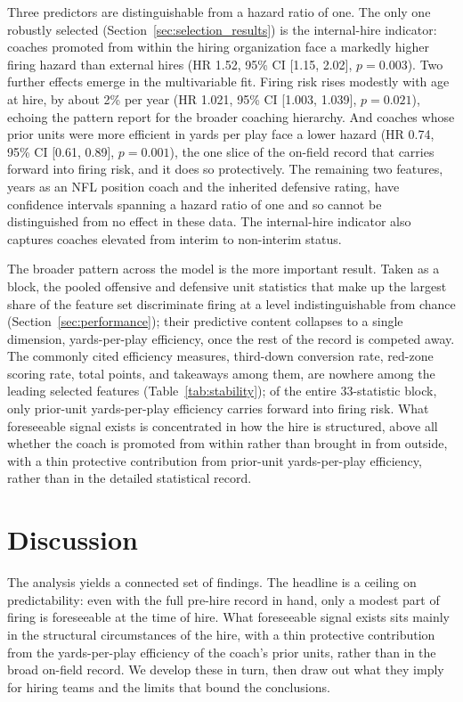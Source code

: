 \documentclass[USenglish]{article}
\theoremstyle{dgthm}
\theoremstyle{dgdef}
\begin{document}
Three predictors are distinguishable from a hazard ratio of one. The only one robustly selected (Section~\ref{sec:selection_results}) is the internal-hire indicator: coaches promoted from within the hiring organization face a markedly higher firing hazard than external hires (HR 1.52, 95\% CI [1.15, 2.02], $p = 0.003$). Two further effects emerge in the multivariable fit. Firing risk rises modestly with age at hire, by about 2\% per year (HR 1.021, 95\% CI [1.003, 1.039], $p = 0.021$), echoing the pattern \citet{farnell2021} report for the broader coaching hierarchy. And coaches whose prior units were more efficient in yards per play face a lower hazard (HR 0.74, 95\% CI [0.61, 0.89], $p = 0.001$), the one slice of the on-field record that carries forward into firing risk, and it does so protectively. The remaining two features, years as an NFL position coach and the inherited defensive rating, have confidence intervals spanning a hazard ratio of one and so cannot be distinguished from no effect in these data. The internal-hire indicator also captures coaches elevated from interim to non-interim status.

The broader pattern across the model is the more important result. Taken as a block, the pooled offensive and defensive unit statistics that make up the largest share of the feature set discriminate firing at a level indistinguishable from chance (Section~\ref{sec:performance}); their predictive content collapses to a single dimension, yards-per-play efficiency, once the rest of the record is competed away. The commonly cited efficiency measures, third-down conversion rate, red-zone scoring rate, total points, and takeaways among them, are nowhere among the leading selected features (Table~\ref{tab:stability}); of the entire 33-statistic block, only prior-unit yards-per-play efficiency carries forward into firing risk. What foreseeable signal exists is concentrated in how the hire is structured, above all whether the coach is promoted from within rather than brought in from outside, with a thin protective contribution from prior-unit yards-per-play efficiency, rather than in the detailed statistical record.

\section{Discussion}

The analysis yields a connected set of findings. The headline is a ceiling on predictability: even with the full pre-hire record in hand, only a modest part of firing is foreseeable at the time of hire. What foreseeable signal exists sits mainly in the structural circumstances of the hire, with a thin protective contribution from the yards-per-play efficiency of the coach's prior units, rather than in the broad on-field record. We develop these in turn, then draw out what they imply for hiring teams and the limits that bound the conclusions.
\end{document}
